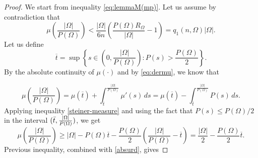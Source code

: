 \documentclass[oneside,a4paper,11pt,notitlepage]{article}
\newcommand{\abs}[1]{{\left|#1\right|}}
\theoremstyle{definition}
\theoremstyle{plain}
\theoremstyle{definition}
\begin{document}
\begin{proof}
    We start from inequality \eqref{eq:lemmaM(mp)}. Let us assume by contradiction that 
    \begin{equation}\label{absurd}
        \mu\left(\frac{\abs{\Omega}}{P(\Omega)}\right)<\frac{\abs{\Omega}}{6n}\left(\frac{P(\Omega)R_\Omega}{|\Omega|}-1\right)=q_1(n,\Omega)\abs{\Omega}.
    \end{equation}
Let us define
    \begin{equation*}
        \overline{t}=\sup\left\{s\in \left(0,\frac{\abs{\Omega}}{P(\Omega)}\right) : P(s)>\frac{P(\Omega)}{2}\right\}.
    \end{equation*}
By the absolute continuity of $\mu(\cdot)$ and by \eqref{eq:dermu}, we know that 

\begin{equation*}
\mu\left(\frac{\abs{\Omega}}{P(\Omega)}\right)=\mu(\overline{t})+ \int_{\overline{t}}^{\frac{\abs{\Omega}}{P(\Omega)}}\mu'(s) \, ds
    =\mu(\overline{t})- \int_{\overline{t}}^{\frac{\abs{\Omega}}{P(\Omega)}}P(s) \, ds.
\end{equation*}
Applying inequality \eqref{steiner-measure} and using the fact that $P(s)\le P(\Omega)/2$ in the interval $(\Bar{t}, \frac{\abs{\Omega}}{P(\Omega)})$, we get
\begin{equation*}
    \mu\left(\frac{\abs{\Omega}}{P(\Omega)}\right)\ge \abs{\Omega}-P(\Omega) \overline{t}- \frac{P(\Omega)}{2}\left(\frac{\abs{\Omega}}{P(\Omega)}-\overline{t}\right)=\frac{\abs{\Omega}}{2}-\frac{P(\Omega)}{2}\overline{t}.
\end{equation*}
Previous inequality, combined with \eqref{absurd}, gives



\end{proof}
\end{document}
